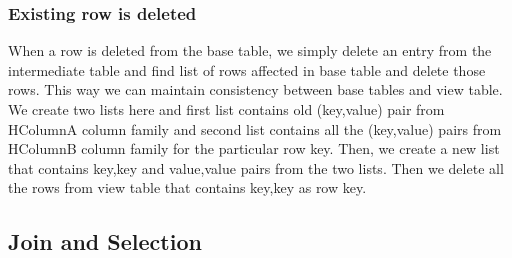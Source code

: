 \documentclass[11pt,a4paper,bibtotoc,idxtotoc,headsepline,footsepline,footexclude,BCOR12mm,DIV13]{scrbook}
\begin{document}
 

\subsubsection{Existing row is deleted}

When a row is deleted from the base table, we simply delete an entry from the intermediate table and find list of rows affected in base table and delete those rows. This way we can maintain consistency between base tables and view table. We create two lists here and first list contains old (key,value) pair from HColumnA column family and second list contains all the (key,value) pairs from HColumnB column family for the particular row key. Then, we create a new list that contains key,key and value,value pairs from the two lists. Then we delete all the rows from view table that contains key,key as row key.

\subsection{Join and Selection}
\label{subsec:joinandselection}
\end{document}
